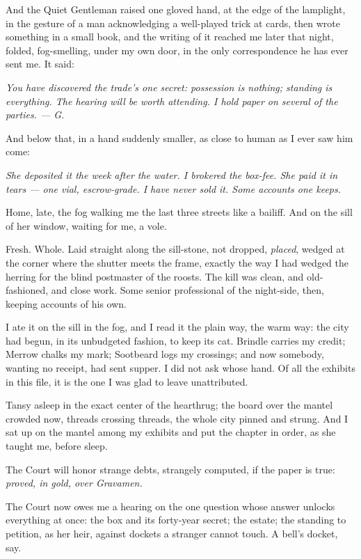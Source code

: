 And the Quiet Gentleman raised one gloved hand, at the edge of the lamplight, in the gesture of a man acknowledging a well-played trick at cards, then wrote something in a small book, and the writing of it reached me later that night, folded, fog-smelling, under my own door, in the only correspondence he has ever sent me. It said:

\emph{You have discovered the trade's one secret: possession is nothing; standing is everything. The hearing will be worth attending. I hold paper on several of the parties. --- G.}

And below that, in a hand suddenly smaller, as close to human as I ever saw him come:

\emph{She deposited it the week after the water. I brokered the box-fee. She paid it in tears --- one vial, escrow-grade. I have never sold it. Some accounts one keeps.}

\scenebreak

Home, late, the fog walking me the last three streets like a bailiff. And on the sill of her window, waiting for me, a vole.

Fresh. Whole. Laid straight along the sill-stone, not dropped, \emph{placed}, wedged at the corner where the shutter meets the frame, exactly the way I had wedged the herring for the blind postmaster of the roosts. The kill was clean, and old-fashioned, and close work. Some senior professional of the night-side, then, keeping accounts of his own.

I ate it on the sill in the fog, and I read it the plain way, the warm way: the city had begun, in its unbudgeted fashion, to keep its cat. Brindle carries my credit; Merrow chalks my mark; Sootbeard logs my crossings; and now somebody, wanting no receipt, had sent supper. I did not ask whose hand. Of all the exhibits in this file, it is the one I was glad to leave unattributed.

Tansy asleep in the exact center of the hearthrug; the board over the mantel crowded now, threads crossing threads, the whole city pinned and strung. And I sat up on the mantel among my exhibits and put the chapter in order, as she taught me, before sleep.

The Court will honor strange debts, strangely computed, if the paper is true: \emph{proved, in gold, over Gravamen.}

The Court now owes me a hearing on the one question whose answer unlocks everything at once: the box and its forty-year secret; the estate; the standing to petition, as her heir, against dockets a stranger cannot touch. A bell's docket, say.

